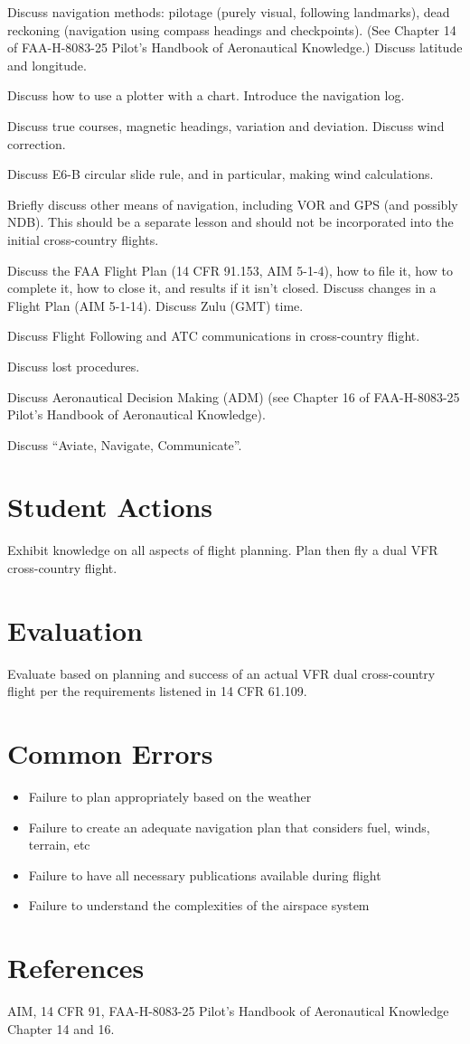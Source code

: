 \documentclass[twoside,openright]{report}
\begin{document}
Discuss navigation methods: pilotage (purely visual, following landmarks), dead
reckoning (navigation using compass headings and checkpoints). (See Chapter 14
of FAA-H-8083-25 Pilot's Handbook of Aeronautical Knowledge.) Discuss latitude
and longitude.

Discuss how to use a plotter with a chart. Introduce the navigation log.

Discuss true courses, magnetic headings, variation and deviation. Discuss wind
correction.

Discuss E6-B circular slide rule, and in particular, making wind calculations.

Briefly discuss other means of navigation, including VOR and GPS (and possibly
NDB). This should be a separate lesson and should not be incorporated into the
initial cross-country flights.

Discuss the FAA Flight Plan (14 CFR 91.153, AIM 5-1-4), how to file it, how to
complete it, how to close it, and results if it isn’t closed. Discuss changes
in a Flight Plan (AIM 5-1-14). Discuss Zulu (GMT) time.

Discuss Flight Following and ATC communications in cross-country flight.

Discuss lost procedures.

Discuss Aeronautical Decision Making (ADM) (see Chapter 16 of FAA-H-8083-25
Pilot's Handbook of Aeronautical Knowledge).

Discuss ``Aviate, Navigate, Communicate''.

\section{Student Actions}

Exhibit knowledge on all aspects of flight planning. Plan then fly a dual VFR
cross-country flight.

\section{Evaluation}

Evaluate based on planning and success of an actual VFR dual cross-country
flight per the requirements listened in 14 CFR 61.109.

\section{Common Errors}

\begin{itemize}
  \item Failure to plan appropriately based on the weather
  \item Failure to create an adequate navigation plan that considers fuel,
    winds, terrain, etc
  \item Failure to have all necessary publications available during flight
  \item Failure to understand the complexities of the airspace system
\end{itemize}

\section{References}

AIM, 14 CFR 91, FAA-H-8083-25 Pilot's Handbook of Aeronautical Knowledge
Chapter 14 and 16.
\end{document}
